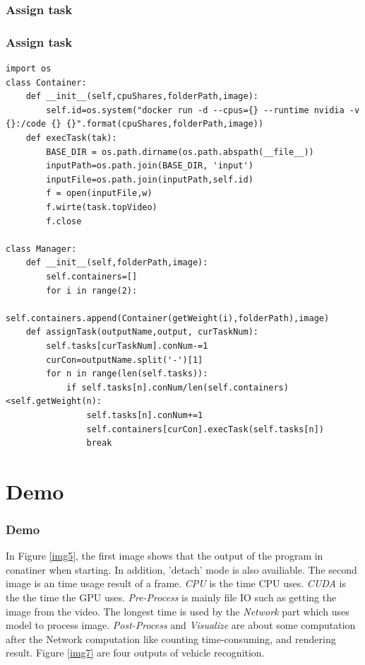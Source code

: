 \documentclass{beamer}
\begin{document}
\subsubsection{Assign task}
\begin{frame}[fragile]
    \frametitle{Assign task} 
\begin{lstlisting}[basicstyle=\tiny]
import os
class Container:
    def __init__(self,cpuShares,folderPath,image):
        self.id=os.system("docker run -d --cpus={} --runtime nvidia -v  {}:/code {} {}".format(cpuShares,folderPath,image))   
    def execTask(tak):
        BASE_DIR = os.path.dirname(os.path.abspath(__file__))
        inputPath=os.path.join(BASE_DIR, 'input')
        inputFile=os.path.join(inputPath,self.id)
        f = open(inputFile,w) 
        f.wirte(task.topVideo)
        f.close
    
class Manager:
    def __init__(self,folderPath,image):
        self.containers=[]
        for i in range(2):
            self.containers.append(Container(getWeight(i),folderPath),image)
    def assignTask(outputName,output, curTaskNum):
        self.tasks[curTaskNum].conNum-=1
        curCon=outputName.split('-')[1]
        for n in range(len(self.tasks)):
            if self.tasks[n].conNum/len(self.containers)<self.getWeight(n):
                self.tasks[n].conNum+=1
                self.containers[curCon].execTask(self.tasks[n])
                break
\end{lstlisting}
\end{frame}
\section{Demo}
\begin{frame}
    \frametitle{Demo} 
    In Figure \ref{img5}, the first image shows that the output of the program in conatiner when starting. In addition, 'detach' mode is also availiable. The second image is an time usage result of a frame. \textit{CPU} is the time CPU uses. \textit{CUDA} is the the time the GPU uses. \textit{Pre-Process} is mainly file IO such as getting the image from the video.  The longest time is used by the \textit{Network} part which uses model to process image. \textit{Post-Process} and \textit{Visualize} are about some computation after the Network computation like counting time-consuming, and rendering result. Figure \ref{img7} are four outputs of vehicle recognition. 
\end{frame}
\end{document}
